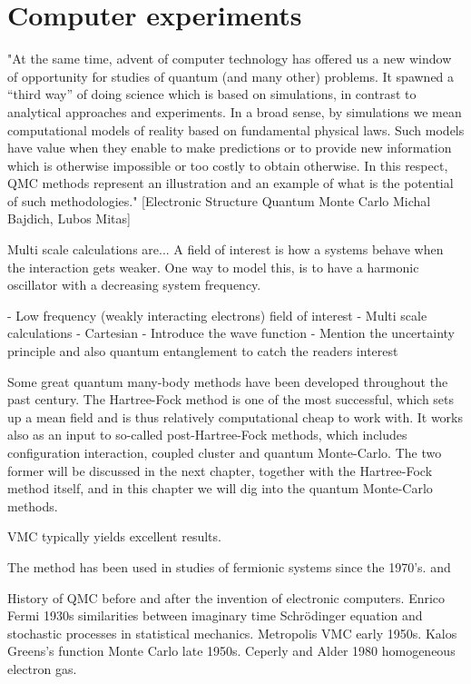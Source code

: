 \section{Computer experiments}
"At the same time, advent of computer technology has
offered us a new window of opportunity for studies of quantum (and many other) problems. It
spawned a “third way” of doing science which is based on simulations, in contrast to analytical
approaches and experiments. In a broad sense, by simulations we mean computational models of
reality based on fundamental physical laws. Such models have value when they enable to make
predictions or to provide new information which is otherwise impossible or too costly to obtain
otherwise. In this respect, QMC methods represent an illustration and an example of what is the
potential of such methodologies." [Electronic Structure Quantum Monte Carlo Michal Bajdich, Lubos Mitas]  

Multi scale calculations are... A field of interest is how a systems behave when the interaction gets weaker. One way to model this, is to have a harmonic oscillator with a decreasing system frequency. 

- Low frequency (weakly interacting electrons) field of interest
- Multi scale calculations
- Cartesian
- Introduce the wave function
- Mention the uncertainty principle and also quantum entanglement to catch the readers interest

Some great quantum many-body methods have been developed throughout the past century. The Hartree-Fock method is one of the most successful, which sets up a mean field and is thus relatively computational cheap to work with. It works also as an input to so-called post-Hartree-Fock methods, which includes configuration interaction, coupled cluster and quantum Monte-Carlo. The two former will be discussed in the next chapter, together with the Hartree-Fock method itself, and in this chapter we will dig into the quantum Monte-Carlo methods. 

VMC typically yields excellent results.

The method has been used in studies of fermionic systems since the 1970's. \cite{deb_variational_2014} and 

History of QMC before and after the invention of electronic computers. Enrico Fermi 1930s similarities between imaginary time Schrödinger equation and stochastic processes in statistical mechanics. Metropolis VMC early 1950s. Kalos Greens's function Monte Carlo late 1950s. Ceperly and Alder 1980 homogeneous electron gas. 

